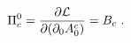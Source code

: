 \begin{equation}
\Pi^{0}_{c}  = \frac{\partial {\cal{L}}}{\partial(\partial_{0}A_{0}^{c})} = B_{c}~.              
\end{equation}

